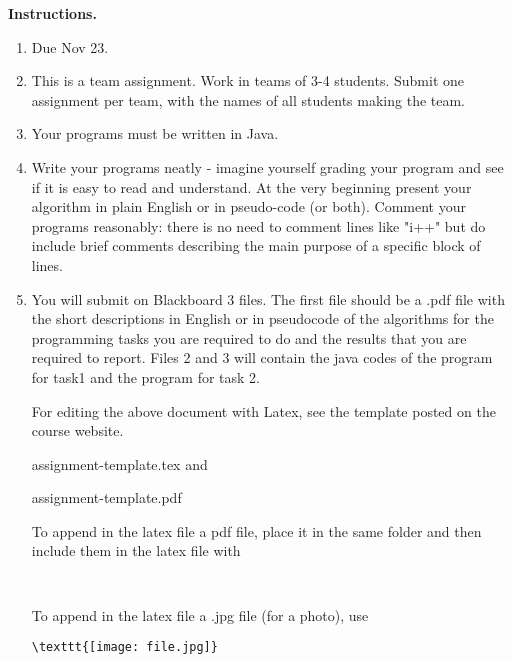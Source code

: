 \documentclass[11pt]{article}
\begin{document}
\vline

\textbf{Instructions.}
\begin{enumerate}
\item Due  Nov 23.



\item This is a team assignment. Work in teams of 3-4 students.  Submit one assignment per team, with the names of all students making the team.


\item Your programs must be written in Java.

\item Write your programs neatly - imagine yourself grading your program and see if it is easy to read and understand. 
At the very beginning present your algorithm in plain English or in pseudo-code (or both).
Comment your programs reasonably: there is no need to comment lines like "i++" but do include brief comments describing the main purpose of a specific block of lines.

\item  You will submit on Blackboard 3 files. The first file should be a .pdf file  with the short descriptions in English or in pseudocode of the algorithms  for the  programming tasks  you are required to do and the results that you are required to report. Files 2 and 3  will contain the java codes of the program for  task1 and the program for task 2.






For editing the above document with  Latex, see the template posted on the course website. 
 
           assignment-template.tex	and
           
          assignment-template.pdf


To append in the  latex file  a pdf file, place it  in the same folder and then include them  in the latex file with 
\begin{verbatim}


\end{verbatim}
To append in the  latex file a .jpg file (for a photo), use 
\begin{verbatim}
\texttt{[image: file.jpg]}

\end{verbatim}


\end{enumerate}
\end{document}
